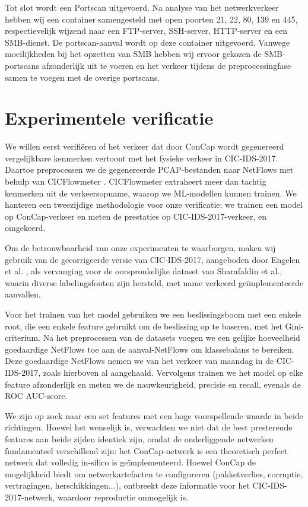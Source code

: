 \documentclass[conference]{IEEEtran}
\begin{document}
	Tot slot wordt een Portscan uitgevoerd. Na analyse van het netwerkverkeer hebben wij een container samengesteld met open poorten 21, 22, 80, 139 en 445, respectievelijk wijzend naar een FTP-server, SSH-server, HTTP-server en een SMB-dienst. De portscan-aanval wordt op deze container uitgevoerd. Vanwege moeilijkheden bij het opzetten van SMB hebben wij ervoor gekozen de SMB-portscans afzonderlijk uit te voeren en het verkeer tijdens de preprocessingfase samen te voegen met de overige portscans.
	
	
	\section{Experimentele verificatie}\label{verification}
	
	We willen eerst verifiëren of het verkeer dat door ConCap wordt gegenereerd vergelijkbare kenmerken vertoont met het fysieke verkeer in CIC-IDS-2017. Daartoe preprocessen we de gegenereerde PCAP-bestanden naar NetFlows met behulp van CICFlowmeter \cite{cicflowmeter}. CICFlowmeter extraheert meer dan tachtig kenmerken uit de verkeersopname, waarop we ML-modellen kunnen trainen. We hanteren een tweezijdige methodologie voor onze verificatie: we trainen een model op ConCap-verkeer en meten de prestaties op CIC-IDS-2017-verkeer, en omgekeerd.
	
	Om de betrouwbaarheid van onze experimenten te waarborgen, maken wij gebruik van de gecorrigeerde versie van CIC-IDS-2017, aangeboden door Engelen et al. \cite{troubleshooting_cic2017}, als vervanging voor de oorspronkelijke dataset van Sharafaldin et al., waarin diverse labelingsfouten zijn hersteld, met name verkeerd geïmplementeerde aanvallen.
	
	Voor het trainen van het model gebruiken we een beslissingsboom met een enkele root, die een enkele feature gebruikt om de beslissing op te baseren, met het Gini-criterium. Na het preprocessen van de datasets voegen we een gelijke hoeveelheid goedaardige NetFlows toe aan de aanval-NetFlows om klassebalans te bereiken. Deze goedaardige NetFlows nemen we van het verkeer van maandag in de CIC-IDS-2017, zoals hierboven al aangehaald. Vervolgens trainen we het model op elke feature afzonderlijk en meten we de nauwkeurigheid, precisie en recall, evenals de ROC AUC-score.
	
	We zijn op zoek naar een set features met een hoge voorspellende waarde in beide richtingen. Hoewel het wenselijk is, verwachten we niet dat de best presterende features aan beide zijden identiek zijn, omdat de onderliggende netwerken fundamenteel verschillend zijn: het ConCap-netwerk is een theoretisch perfect netwerk dat volledig in-silico is geïmplementeerd. Hoewel ConCap de mogelijkheid biedt om netwerkartefacten te configureren (pakketverlies, corruptie, vertragingen, herschikkingen...), ontbreekt deze informatie voor het CIC-IDS-2017-netwerk, waardoor reproductie onmogelijk is.
	
\end{document}
